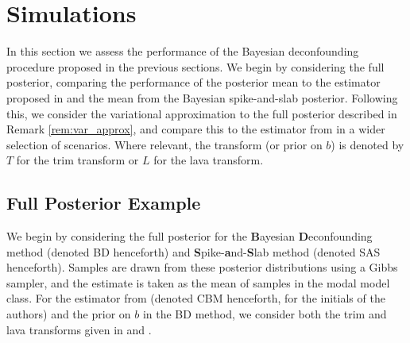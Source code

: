 \documentclass[11pt]{article}
\newcommand{\R}{\mathbb{R}}
\numberwithin{equation}{section}
\begin{document}
%
%

\section{Simulations}\label{sect:simulations}
In this section we assess the performance of the Bayesian deconfounding procedure proposed in the previous sections.
We begin by considering the full posterior, comparing the performance of the posterior mean to the estimator proposed in \cite{CBM2020} and the mean from the Bayesian spike-and-slab posterior. Following this, we consider the variational approximation to the full posterior described in Remark \ref{rem:var_approx}, and compare this to the estimator from \cite{CBM2020} in a wider selection of scenarios. Where relevant, the transform (or prior on $b$) is denoted by $T$ for the trim transform or $L$ for the lava transform.
\subsection{Full Posterior Example}
We begin by considering the full posterior for the {\bf B}ayesian {\bf D}econfounding method (denoted BD henceforth) and {\bf S}pike-{\bf a}nd-{\bf S}lab method (denoted SAS henceforth). Samples are drawn from these posterior distributions using a Gibbs sampler, and the estimate is taken as the mean of samples in the modal model class. For the estimator from \cite{CBM2020} (denoted CBM henceforth, for the initials of the authors) and the prior on $b$ in the BD method, we consider both the trim and lava transforms given in \cite{CBM2020} and \cite{Chernozhukov2017}.
\end{document}
